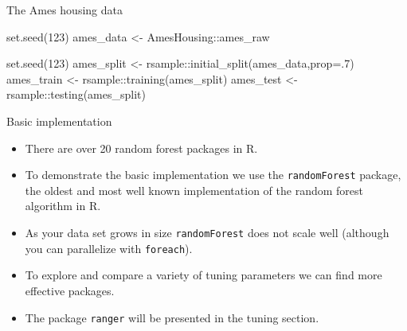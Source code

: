 \documentclass[
  10pt,
  ignorenonframetext,
]{beamer}
\newenvironment{Shaded}{}{}
\newcommand{\DataTypeTok}[1]{#1}
\newcommand{\DecValTok}[1]{#1}
\newcommand{\KeywordTok}[1]{\textcolor[rgb]{0.00,0.00,1.00}{#1}}
\newcommand{\NormalTok}[1]{#1}
\newcommand{\OperatorTok}[1]{#1}
\newcommand{\StringTok}[1]{\textcolor[rgb]{0.00,0.50,0.50}{#1}}
\providecommand{\tightlist}{%
  \setlength{\itemsep}{0pt}\setlength{\parskip}{0pt}}
\begin{document}
\begin{frame}[fragile]{The Ames housing data}
\protect\hypertarget{the-ames-housing-data}{}

\begin{Shaded}
\begin{Highlighting}[]
\KeywordTok{set.seed}\NormalTok{(}\DecValTok{123}\NormalTok{)}
\NormalTok{ames_data <-}\StringTok{ }\NormalTok{AmesHousing}\OperatorTok{::}\NormalTok{ames_raw}
\end{Highlighting}
\end{Shaded}

\begin{Shaded}
\begin{Highlighting}[]
\KeywordTok{set.seed}\NormalTok{(}\DecValTok{123}\NormalTok{)}
\NormalTok{ames_split <-}\StringTok{ }\NormalTok{rsample}\OperatorTok{::}\KeywordTok{initial_split}\NormalTok{(ames_data,}\DataTypeTok{prop=}\NormalTok{.}\DecValTok{7}\NormalTok{)}
\NormalTok{ames_train <-}\StringTok{ }\NormalTok{rsample}\OperatorTok{::}\KeywordTok{training}\NormalTok{(ames_split)}
\NormalTok{ames_test  <-}\StringTok{ }\NormalTok{rsample}\OperatorTok{::}\KeywordTok{testing}\NormalTok{(ames_split)}
\end{Highlighting}
\end{Shaded}

\end{frame}

\begin{frame}[fragile]{Basic implementation}
\protect\hypertarget{basic-implementation}{}

\begin{itemize}
\tightlist
\item
  There are over 20 random forest packages in R.
\item
  To demonstrate the basic implementation we use the
  \texttt{randomForest} package, the oldest and most well known
  implementation of the random forest algorithm in R.
\item
  As your data set grows in size \texttt{randomForest} does not scale
  well (although you can parallelize with \texttt{foreach}).
\item
  To explore and compare a variety of tuning parameters we can find more
  effective packages.
\item
  The package \texttt{ranger} will be presented in the tuning section.
\end{itemize}

\end{frame}
\end{document}

